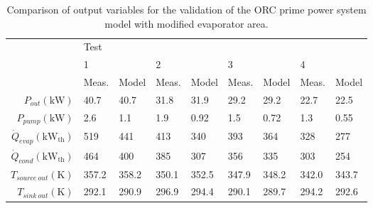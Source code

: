 \begin{table}[h]
	\centering
	\caption{Comparison of output variables for the validation of the ORC prime power system model with modified evaporator area.}
	\label{tab:verification_results02}
	\begin{tabular}{rllllllll}
		\toprule
		                                           & Test  &       &       &       &       &       &       &       \\ \cline{2-9}
		                                           & 1     &       & 2     &       & 3     &       & 4     &       \\
		                                           & Meas. & Model & Meas. & Model & Meas. & Model & Meas. & Model \\ \midrule
		              $P_{out}(\si{\kilo\watt})$ & 40.7  & 40.7  & 31.8  & 31.9  & 29.2  & 29.2  & 22.7  & 22.5  \\
		               $P_{pump}(\si{\kilo\watt})$ & 2.6   & 1.1   & 1.9   & 0.92  & 1.5   & 0.72  & 1.3   & 0.55  \\
 $\dot{Q}_{evap}(\si{\kilo\watt}_\text{th})$ & 519   & 441   & 413   & 340   & 393   & 364   & 328   & 277   \\
 $\dot{Q}_{cond}(\si{\kilo\watt}_\text{th})$ & 464   & 400   & 385   & 307   & 356   & 335   & 303   & 254   \\
		            $T_{source\ out}(\si{\kelvin})$ & 357.2 & 358.2 & 350.1 & 352.5 & 347.9 & 348.2 & 342.0 & 343.7 \\
		              $T_{sink\ out}(\si{\kelvin})$ & 292.1 & 290.9 & 296.9 & 294.4 & 290.1 & 289.7 & 294.2 & 292.6 \\ \bottomrule
	\end{tabular}
\end{table}

